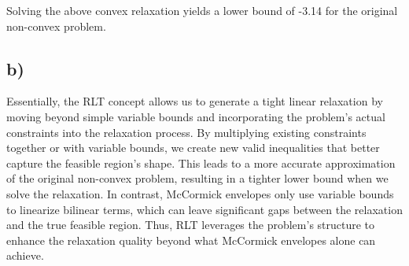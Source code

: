 \documentclass{article} %
\begin{document}
    Solving the above convex relaxation yields a lower bound of -3.14 for the original non-convex problem.
    
    \subsection*{b)}
    Essentially, the RLT concept allows us to generate a tight linear relaxation by moving beyond simple variable bounds and incorporating the problem's actual constraints into the relaxation process.
    By multiplying existing constraints together or with variable bounds, we create new valid inequalities that better capture the feasible region's shape.
    This leads to a more accurate approximation of the original non-convex problem, resulting in a tighter lower bound when we solve the relaxation.
    In contrast, McCormick envelopes only use variable bounds to linearize bilinear terms, which can leave significant gaps between the relaxation and the true feasible region.
    Thus, RLT leverages the problem's structure to enhance the relaxation quality beyond what McCormick envelopes alone can achieve.
    
\end{document}
